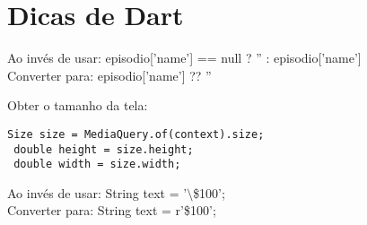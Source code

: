\documentclass[11pt]{scrartcl}
\begin{document}
\section{Dicas de Dart}

Ao invés de usar: {\ttfamily episodio['name'] == null ? '' : episodio['name']} \\
Converter para: {\ttfamily episodio['name'] ?? ''}

Obter o tamanho da tela:
\begin{lstlisting}[]
 Size size = MediaQuery.of(context).size;
 double height = size.height;
 double width = size.width;
\end{lstlisting}

Ao invés de usar: {\ttfamily String text = '$\setminus$\$100';} \\
Converter para: {\ttfamily String text = r'\$100';}
\end{document}

